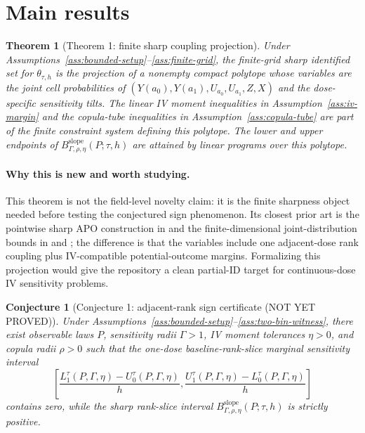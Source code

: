 \documentclass[11pt]{article}
\theoremstyle{definition}
\theoremstyle{plain}
\newtheorem{theorem}{Theorem}
\newtheorem{conjecture}{Conjecture}
\theoremstyle{remark}
\begin{document}
\section{Main results}
\begin{theorem}[Theorem 1: finite sharp coupling projection]\label{thm:finite-coupling-bound}
Under Assumptions~\ref{ass:bounded-setup}--\ref{ass:finite-grid}, the finite-grid sharp identified set for \(\theta_{\tau,h}\) is the projection of a nonempty compact polytope whose variables are the joint cell probabilities of \((Y(a_0),Y(a_1),U_{a_0},U_{a_1},Z,X)\) and the dose-specific sensitivity tilts.  The linear IV moment inequalities in Assumption~\ref{ass:iv-margin} and the copula-tube inequalities in Assumption~\ref{ass:copula-tube} are part of the finite constraint system defining this polytope.  The lower and upper endpoints of \(B_{\Gamma,\rho,\eta}^{\mathrm{slope}}(P;\tau,h)\) are attained by linear programs over this polytope.
\end{theorem}

\paragraph{Why this is new and worth studying.}
This theorem is not the field-level novelty claim: it is the finite sharpness object needed before testing the conjectured sign phenomenon.  Its closest prior art is the pointwise sharp APO construction in \citet{BaitairianSebastienJreichKatsahianGuilloux2025} and the finite-dimensional joint-distribution bounds in \citet{FirpoRidder2019} and \citet{FanGuerreZhu2017}; the difference is that the variables include one adjacent-dose rank coupling plus IV-compatible potential-outcome margins.  Formalizing this projection would give the repository a clean partial-ID target for continuous-dose IV sensitivity problems.

\begin{conjecture}[Conjecture 1: adjacent-rank sign certificate (NOT YET PROVED)]\label{conj:sign-certificate}
Under Assumptions~\ref{ass:bounded-setup}--\ref{ass:two-bin-witness}, there exist observable laws \(P\), sensitivity radii \(\Gamma>1\), IV moment tolerances \(\eta>0\), and copula radii \(\rho>0\) such that the one-dose baseline-rank-slice marginal sensitivity interval
\[
\left[\frac{L_1^\tau(P,\Gamma,\eta)-U_0^\tau(P,\Gamma,\eta)}{h},
\frac{U_1^\tau(P,\Gamma,\eta)-L_0^\tau(P,\Gamma,\eta)}{h}\right]
\]
contains zero, while the sharp rank-slice interval \(B_{\Gamma,\rho,\eta}^{\mathrm{slope}}(P;\tau,h)\) is strictly positive.
\end{conjecture}
\end{document}
